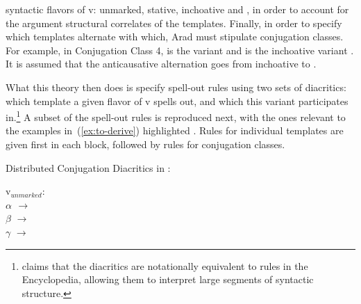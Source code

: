 \begin{exe}
\begin{xlist}
\begin{xlist}
\begin{exe}
\begin{xlist}
\begin{xlist}
\begin{exe}
\begin{xlist}
\begin{xlist}
\begin{exe}
\begin{exe}
\begin{xlist}
\begin{exe}
\begin{exe}
\begin{xlist}
\begin{exe}
\begin{exe}
\begin{exe}
\begin{exe}
\begin{exe}
\begin{xlist}
\begin{exe}
\begin{xlist}
\begin{exe}
\begin{exe}
\begin{xlist}
\begin{exe}
\begin{xlist}
\begin{exe}
\begin{xlist}
\begin{exe}
\begin{exe}
\begin{exe}
\begin{xlist}
\begin{exe}
\begin{exe}
\begin{exe}
\begin{xlist}
\begin{exe}
\begin{xlist}
\begin{exe}
\begin{exe}
\begin{xlist}
\begin{exe}
\begin{exe}
\begin{exe}
\begin{exe}
\begin{xlist}
\begin{exe}
\begin{xlist}
\begin{exe}
\begin{xlist}
\begin{exe}
\begin{xlist}
\begin{exe}
\begin{xlist}
\begin{exe}
\begin{xlist}
\begin{exe}
\begin{exe}
\begin{xlist}
\begin{exe}
\begin{xlist}
\begin{exe}
\begin{exe}
\begin{xlist}
\begin{exe}
\begin{xlist}
\begin{exe}
\begin{exe}
\begin{exe}
\begin{exe}
\begin{xlist}
\begin{xlist}
\begin{exe}
\begin{xlist}
\begin{exe}
\begin{exe}
\begin{exe}
\begin{xlist}
\begin{exe}
\begin{exe}
\begin{xlist}
\begin{exe}
\begin{exe}
\begin{exe}
\begin{xlist}
\begin{xlist}
\begin{exe}
\begin{xlist}
\begin{exe}
\begin{exe}
\begin{exe}
\begin{exe}
\begin{xlist}
\begin{exe}
\begin{xlist}
\begin{exe}
\begin{xlist}
\begin{exe}
\begin{xlist}
\begin{exe}
\begin{exe}
\begin{exe}
\begin{exe}
\begin{exe}
\begin{xlist}
\begin{exe}
\begin{xlist}
\begin{exe}
\begin{xlist}
\begin{xlist}
\begin{exe}
\begin{xlist}
\begin{exe}
\begin{xlist}
\begin{exe}
\begin{xlist}
syntactic flavors of v: unmarked, stative, inchoative and , in order to account for the argument structural correlates of the templates. Finally, in order to specify which templates alternate with which, Arad must stipulate conjugation classes. For example, in Conjugation Class 4, {\tpie} is the  variant and {\thit} is the inchoative variant \citep[220]{arad05}. It is assumed that the anticausative alternation goes from inchoative to .
		
What this theory then does is specify spell-out rules using two sets of diacritics: which template a given flavor of v spells out, and which  this variant participates in.\footnote{\citet[227ff41]{arad05} claims that the diacritics are notationally equivalent to rules in the Encyclopedia, allowing them to interpret large segments of syntactic structure.} A subset of the spell-out rules is reproduced next, with the ones relevant to the examples in~(\ref{ex:to-derive}) highlighted \citep[230--231]{arad05}. Rules for individual templates are given first in each block, followed by rules for conjugation classes.

 \begin{exe}
 \ex  Distributed Conjugation Diacritics in \cite{arad05}: \label{ex:arad-classes} 
 \begin{xlist} 
\begin{multicols}{2}
 	\ex   v$_{unmarked}$: \\
			\textbf{$ \alpha$ $\rightarrow$ {\tkal}} \\
			$\beta$ $\rightarrow$ {\tnif}\\
			$\gamma$ $\rightarrow$ 
\end{multicols}
\end{xlist}
\end{exe}
\end{xlist}
\end{exe}
\end{xlist}
\end{exe}
\end{xlist}
\end{exe}
\end{xlist}
\end{xlist}
\end{exe}
\end{xlist}
\end{exe}
\end{xlist}
\end{exe}
\end{exe}
\end{exe}
\end{exe}
\end{exe}
\end{xlist}
\end{exe}
\end{xlist}
\end{exe}
\end{xlist}
\end{exe}
\end{xlist}
\end{exe}
\end{exe}
\end{exe}
\end{exe}
\end{xlist}
\end{exe}
\end{xlist}
\end{xlist}
\end{exe}
\end{exe}
\end{exe}
\end{xlist}
\end{exe}
\end{exe}
\end{xlist}
\end{exe}
\end{exe}
\end{exe}
\end{xlist}
\end{exe}
\end{xlist}
\end{xlist}
\end{exe}
\end{exe}
\end{exe}
\end{exe}
\end{xlist}
\end{exe}
\end{xlist}
\end{exe}
\end{exe}
\end{xlist}
\end{exe}
\end{xlist}
\end{exe}
\end{exe}
\end{xlist}
\end{exe}
\end{xlist}
\end{exe}
\end{xlist}
\end{exe}
\end{xlist}
\end{exe}
\end{xlist}
\end{exe}
\end{xlist}
\end{exe}
\end{exe}
\end{exe}
\end{exe}
\end{xlist}
\end{exe}
\end{exe}
\end{xlist}
\end{exe}
\end{xlist}
\end{exe}
\end{exe}
\end{exe}
\end{xlist}
\end{exe}
\end{exe}
\end{exe}
\end{xlist}
\end{exe}
\end{xlist}
\end{exe}
\end{xlist}
\end{exe}
\end{exe}
\end{xlist}
\end{exe}
\end{xlist}
\end{exe}
\end{exe}
\end{exe}
\end{exe}
\end{exe}
\end{xlist}
\end{exe}
\end{exe}
\end{xlist}
\end{exe}
\end{exe}
\end{xlist}
\end{xlist}
\end{exe}
\end{xlist}
\end{xlist}
\end{exe}
\end{xlist}
\end{xlist}
\end{exe}
